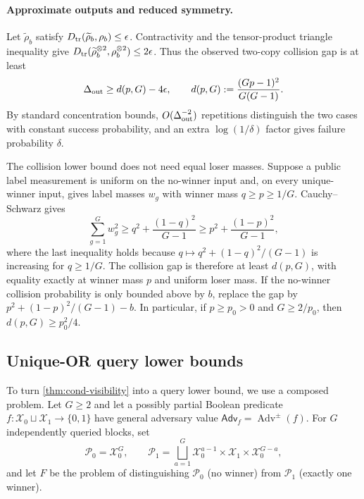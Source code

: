 \paragraph{Approximate outputs and reduced symmetry.}
Let $\widetilde\rho_b$ satisfy
$D_{\mathrm{tr}}(\widetilde\rho_b,\rho_b)\le\epsilon$.  Contractivity and the
tensor-product triangle inequality give
$D_{\mathrm{tr}}(\widetilde\rho_b^{\otimes2},\rho_b^{\otimes2})\le2\epsilon$.
Thus the observed two-copy collision gap is at least
\begin{equation}
 \Delta_{\rm out}\ge d(p,G)-4\epsilon,
 \qquad d(p,G):=\frac{(Gp-1)^2}{G(G-1)}.                  \label{eq:cond-output-gap}
\end{equation}
By standard concentration bounds, $O(\Delta_{\rm out}^{-2})$ repetitions
distinguish the two cases with constant success probability, and an extra
$\log(1/\delta)$ factor gives failure probability $\delta$.

The collision lower bound does not need equal loser masses.  Suppose a
public label measurement is uniform on the no-winner input and, on every
unique-winner input, gives label masses $w_g$ with winner mass
$q\ge p\ge1/G$.  Cauchy--Schwarz gives
\begin{equation}
 \sum_{g=1}^G w_g^2\ge q^2+\frac{(1-q)^2}{G-1}
 \ge p^2+\frac{(1-p)^2}{G-1},                            \label{eq:cond-symmetry-light}
\end{equation}
where the last inequality holds because
$q\mapsto q^2+(1-q)^2/(G-1)$ is increasing for $q\ge1/G$.  The collision gap is therefore at least $d(p,G)$, with
equality exactly at winner mass $p$ and uniform loser mass.  If the
no-winner collision probability is only bounded above by $b$, replace the
gap by $p^2+(1-p)^2/(G-1)-b$.  In particular, if $p\ge p_0>0$ and
$G\ge2/p_0$, then $d(p,G)\ge p_0^2/4$.

\subsection{Unique-OR query lower bounds}
\label{sec:condensation-query-lower}

To turn \cref{thm:cond-visibility} into a query lower bound, we use a
composed problem.  Let $G\ge2$ and let a possibly partial Boolean predicate
$f:\mathcal X_0\sqcup\mathcal X_1\to\{0,1\}$ have general adversary value
$\mathsf{Adv}_f=\operatorname{Adv}^{\pm}(f)$.  For $G$ independently queried
blocks, set
\begin{equation}
 \mathcal P_0=\mathcal X_0^G,
 \qquad
 \mathcal P_1=\bigsqcup_{a=1}^G
 \mathcal X_0^{a-1}\times\mathcal X_1\times\mathcal X_0^{G-a},
 \label{eq:cond-unique-or-promise}
\end{equation}
and let $F$ be the problem of distinguishing $\mathcal P_0$ (no winner) from
$\mathcal P_1$ (exactly one winner).

